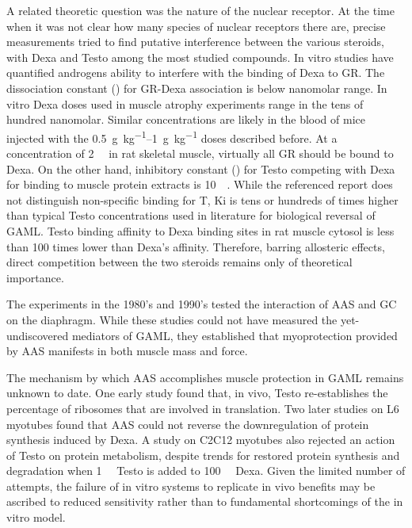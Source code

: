 \documentclass[12pt,english]{report}\usepackage[]{graphicx}\usepackage[]{color}
\begin{document}
A related theoretic question was the nature of the nuclear receptor.
At the time when it was not clear how many species of nuclear receptors
there are, precise measurements tried to find putative interference
between the various steroids, with Dexa and Testo among the most studied
compounds. In vitro studies have quantified androgens ability to interfere
with the binding of Dexa to GR. The dissociation constant ()
for GR-Dexa association is below nanomolar range\citep{levy1989glucocorticoid}.
In vitro Dexa doses used in muscle atrophy experiments range in the
tens of hundred nanomolar. Similar concentrations are likely in the
blood of mice injected with the \SIrange{0.5}{1}{\gram\per\kilo\gram}
doses described before. At a concentration of \SI{2}{\pico\molar}
in rat skeletal muscle\citep{dahlberg1981regulation}, virtually all
GR should be bound to Dexa. On the other hand, inhibitory constant
() for Testo competing with
Dexa for binding to muscle protein extracts is \SI{10}{\micro\molar}\citep{mayer1975interaction}.
While the referenced report does not distinguish non-specific binding
for T, Ki is tens or hundreds of times higher than typical Testo concentrations
used in literature for biological reversal of GAML. Testo binding
affinity to Dexa binding sites in rat muscle cytosol is less than
100 times lower than Dexa's affinity\citep{snochowski1980characterization}.
Therefore, barring allosteric effects, direct competition between
the two steroids remains only of theoretical importance.

The experiments in the 1980's and 1990's tested the interaction of
AAS and GC on the diaphragm. While these studies could not have measured
the yet-undiscovered mediators of GAML, they established that myoprotection
provided by AAS manifests in both muscle mass and force\citep{ferguson1995effects,vanbalkom1998anabolic,eason2003use}.

The mechanism by which AAS accomplishes muscle protection in GAML
remains unknown to date. One early study found that, in vivo, Testo
re-establishes the percentage of ribosomes that are involved in translation\citep{bullock1968effects}.
Two later studies on L6 myotubes found that AAS could not reverse
the downregulation of protein synthesis induced by Dexa\citep{ballard1983effects,roeder1986influence}.
A study on C2C12 myotubes also rejected an action of Testo on protein
metabolism, despite trends for restored protein synthesis and degradation
when \SI{1}{\micro\molar} Testo is added to \SI{100}{\nano\molar}
Dexa\citep{desler1996effects}. Given the limited number of attempts,
the failure of in vitro systems to replicate in vivo benefits may
be ascribed to reduced sensitivity rather than to fundamental shortcomings
of the in vitro model.
\end{document}
